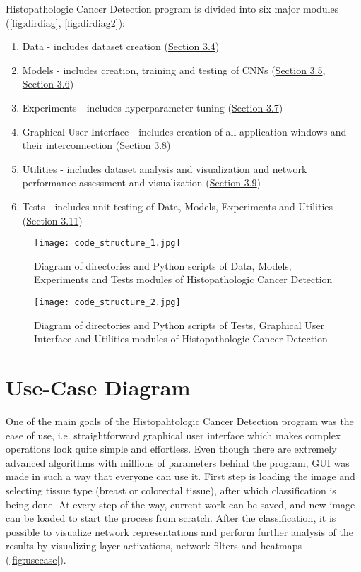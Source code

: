 Histopathologic Cancer Detection program is divided into six major modules (\textcolor{red}{\autoref{fig:dirdiag}}, \textcolor{red}{\autoref{fig:dirdiag2}}):
\begin{enumerate}
	\itemsep 0em
	\item Data - includes dataset creation (\textcolor{red}{\hyperref[createdata]{Section 3.4}})
	\item Models - includes creation, training and testing of CNNs (\textcolor{red}{\hyperref[cnn]{Section 3.5}\textcolor{black}{,} \\ \hyperref[vgg19]{Section 3.6}})
	\item Experiments - includes hyperparameter tuning (\textcolor{red}{\hyperref[exp]{Section 3.7}})
	\item Graphical User Interface - includes creation of all application windows and their interconnection (\textcolor{red}{\hyperref[gui]{Section 3.8}})
	\item Utilities - includes dataset analysis and visualization and network performance assessment and visualization (\textcolor{red}{\hyperref[utils]{Section 3.9}})
	\item Tests - includes unit testing of Data, Models, Experiments and Utilities (\textcolor{red}{\hyperref[tests]{Section 3.11}})
\end{enumerate}

\begin{figure}[h]
	\centering
	\texttt{[image: code\_structure\_1.jpg]}
	\caption{Diagram of directories and Python scripts of Data, Models, Experiments and Tests modules of Histopathologic Cancer Detection}
	\label{fig:dirdiag}
\end{figure}

\clearpage

\begin{figure}[h]
	\centering
	\texttt{[image: code\_structure\_2.jpg]}
	\caption{Diagram of directories and Python scripts of Tests, Graphical User Interface and Utilities modules of Histopathologic Cancer Detection}
	\label{fig:dirdiag2}
\end{figure}

\section{Use-Case Diagram}

One of the main goals of the Histopahtologic Cancer Detection program was the ease of use, i.e. straightforward graphical user interface which makes complex operations look quite simple and effortless. Even though there are extremely advanced algorithms with millions of parameters behind the program, GUI was made in such a way that everyone can use it. 
First step is loading the image and selecting tissue type (breast or colorectal tissue), after which classification is being done. At every step of the way, current work can be saved, and new image can be loaded to start the process from scratch. After the classification, it is possible to visualize network representations and perform further analysis of the results by visualizing layer activations, network filters and heatmaps (\textcolor{red}{\autoref{fig:usecase}}).


